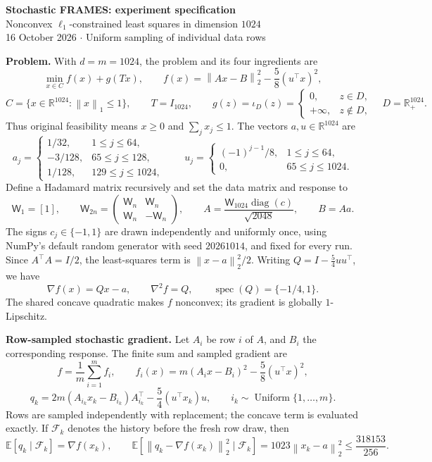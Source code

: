 \documentclass[10pt,a4paper]{article}
\newcommand{\R}{\mathbb R}
\newcommand{\E}{\mathbb E}
\newcommand{\norm}[1]{\left\|#1\right\|}
\begin{document}
\begin{center}
{\Large\bfseries Stochastic FRAMES: experiment specification}\\[3pt]
{\large Nonconvex $\ell_1$-constrained least squares in dimension $1024$}\\[2pt]
16 October 2026 \quad $\cdot$ \quad Uniform sampling of individual data rows
\end{center}

\textbf{Problem.} With $d=m=1024$, the problem and its four ingredients are
\[
\boxed{\min_{x\in C} f(x)+g(Tx),\qquad
 f(x)=\norm{Ax-B}_2^2-\frac58(u^\top x)^2,}
\]
\[
C=\{x\in\R^{1024}:\norm{x}_1\le1\},\qquad T=I_{1024},\qquad
g(z)=\iota_D(z)=\begin{cases}0,&z\in D,\\+\infty,&z\notin D,\end{cases}
\quad D=\R_+^{1024}.
\]
Thus original feasibility means $x\ge0$ and $\sum_jx_j\le1$.
The vectors $a,u\in\R^{1024}$ are
\[
a_j=\begin{cases}
1/32,&1\le j\le64,\\
-3/128,&65\le j\le128,\\
1/128,&129\le j\le1024,
\end{cases}
\qquad
u_j=\begin{cases}
(-1)^{j-1}/8,&1\le j\le64,\\
0,&65\le j\le1024.
\end{cases}
\]
Define a Hadamard matrix recursively and set the data matrix and response to
\[
\mathsf W_1=[1],\qquad
\mathsf W_{2n}=\begin{pmatrix}\mathsf W_n&\mathsf W_n\\
\mathsf W_n&-\mathsf W_n\end{pmatrix},\qquad
\boxed{A=\frac{\mathsf W_{1024}\operatorname{diag}(c)}{\sqrt{2048}},\qquad B=Aa.}
\]
The signs $c_j\in\{-1,1\}$ are drawn independently and uniformly once, using
NumPy's default random generator with seed $20261014$, and fixed for every run.
Since $A^\top A=I/2$, the least-squares term is $\norm{x-a}_2^2/2$.
Writing $Q=I-\frac54uu^\top$, we have
\[
\nabla f(x)=Qx-a,\qquad
\nabla^2 f=Q,\qquad
\operatorname{spec}(Q)=\{-1/4,1\}.
\]
The shared concave quadratic makes $f$ nonconvex; its gradient is globally
$1$-Lipschitz.

\textbf{Row-sampled stochastic gradient.} Let $A_i$ be row $i$ of $A$, and $B_i$
the corresponding response. The finite sum and sampled gradient are
\[
f=\frac1m\sum_{i=1}^m f_i,\qquad
f_i(x)=m(A_ix-B_i)^2-\frac58(u^\top x)^2,
\]
\[
\boxed{q_k=2m(A_{i_k}x_k-B_{i_k})A_{i_k}^\top
       -\frac54(u^\top x_k)u,\qquad
 i_k\sim\operatorname{Uniform}\{1,\ldots,m\}.}
\]
Rows are sampled independently with replacement; the concave term is evaluated
exactly. If $\mathcal F_k$ denotes the history before the fresh row draw, then
\[
\E[q_k\mid\mathcal F_k]=\nabla f(x_k),\qquad
\E[\norm{q_k-\nabla f(x_k)}_2^2\mid\mathcal F_k]
=1023\norm{x_k-a}_2^2\le\frac{318153}{256}.
\]
\end{document}
